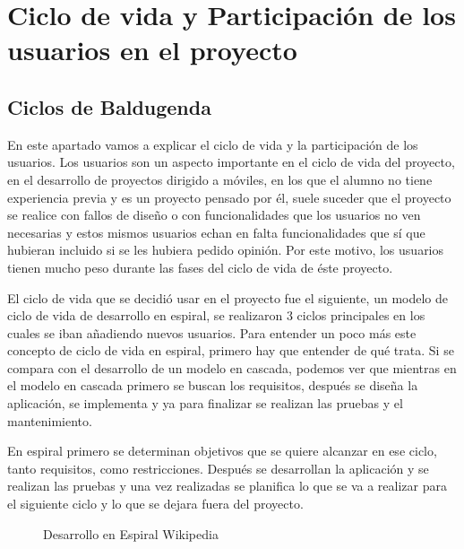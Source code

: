 \chapter{Ciclo de vida y Participación de los usuarios en el proyecto}
\label{ch:ciclo de vida}




\section{Ciclos de Baldugenda}
\label{secc:ciclos de Baldugenda}

En este apartado vamos a explicar el ciclo de vida y la participación de los usuarios. 
Los usuarios son un aspecto importante en el ciclo de vida del proyecto, en el desarrollo de proyectos dirigido a móviles, en los que el alumno no tiene experiencia previa y es un proyecto pensado por él, suele suceder que el proyecto se realice con fallos de diseño o con funcionalidades que los usuarios no ven necesarias y estos mismos usuarios echan en falta funcionalidades que sí que hubieran incluido si se les hubiera pedido opinión. 
Por este motivo, los usuarios tienen mucho peso durante las fases del ciclo de vida de éste proyecto.

El ciclo de vida que se decidió usar en el proyecto fue el siguiente, un modelo de ciclo de vida de desarrollo en espiral, se realizaron 3 ciclos principales en los cuales se iban añadiendo nuevos usuarios.
Para entender un poco más este concepto de ciclo de vida en espiral, primero hay que entender de qué trata. Si se compara con el desarrollo de un modelo en cascada, podemos ver que mientras en el modelo en cascada primero se buscan los requisitos, después se diseña la aplicación, se implementa y ya para finalizar se realizan las pruebas y el mantenimiento. 

En espiral primero se determinan objetivos que se quiere alcanzar en ese ciclo, tanto requisitos, como restricciones. Después se desarrollan la aplicación y se realizan las pruebas y una vez realizadas se planifica lo que se va a realizar para el siguiente ciclo y lo que se dejara fuera del proyecto. 

\begin{figure}[H] 
  \begin{center} 
    \caption{Desarrollo en Espiral Wikipedia} 
    \label{fig:Espiral} 
  \end{center} 
\end{figure}

